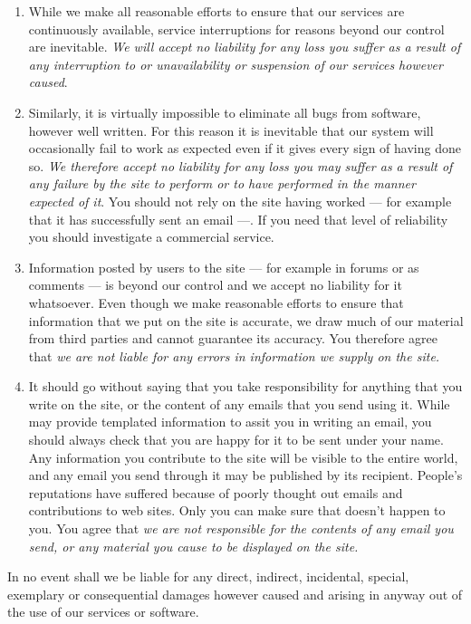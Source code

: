 \begin{enumerate}

\item
  While we make all reasonable efforts to ensure that our services are
  continuously available, service interruptions for reasons beyond our
  control are inevitable. \emph{We will accept no liability for any loss
  you suffer as a result of any interruption to or unavailability or
  suspension of our services however caused}.
\item
  Similarly, it is virtually impossible to eliminate all bugs from
  software, however well written. For this reason it is inevitable that
  our system will occasionally fail to work as expected even if it gives
  every sign of having done so. \emph{We therefore accept no liability
  for any loss you may suffer as a result of any failure by the site to
  perform or to have performed in the manner expected of it}. You should
  not rely on the site having worked --- for example that it has
  successfully sent an email ---. If you need that level of reliability
  you should investigate a commercial service.
\item
  Information posted by users to the site --- for example in forums or
  as comments --- is beyond our control and we accept no liability for
  it whatsoever. Even though we make reasonable efforts to ensure that
  information that we put on the site is accurate, we draw much of our
  material from third parties and cannot guarantee its accuracy. You
  therefore agree that \emph{we are not liable for any errors in
  information we supply on the site.}
\item
  It should go without saying that you take responsibility for anything
  that you write on the site, or the content of any emails that you send
  using it. While may provide templated information to assit you in
  writing an email, you should always check that you are happy for it to
  be sent under your name. Any information you contribute to the site
  will be visible to the entire world, and any email you send through it
  may be published by its recipient. People's reputations have suffered
  because of poorly thought out emails and contributions to web sites.
  Only you can make sure that doesn't happen to you. You agree that
  \emph{we are not responsible for the contents of any email you send,
  or any material you cause to be displayed on the site.}
\end{enumerate}

In no event shall we be liable for any direct, indirect, incidental,
special, exemplary or consequential damages however caused and arising
in anyway out of the use of our services or software.

